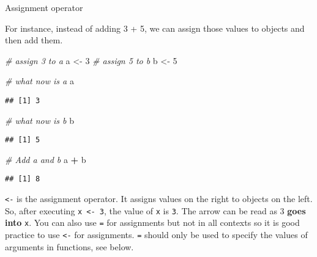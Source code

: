 \documentclass[
  11pt,
  ignorenonframetext,
]{beamer}
\newenvironment{Shaded}{\begin{snugshade}}{\end{snugshade}}
\newcommand{\CommentTok}[1]{\textcolor[rgb]{0.56,0.35,0.01}{\textit{#1}}}
\newcommand{\DecValTok}[1]{\textcolor[rgb]{0.00,0.00,0.81}{#1}}
\newcommand{\NormalTok}[1]{#1}
\newcommand{\OperatorTok}[1]{\textcolor[rgb]{0.81,0.36,0.00}{\textbf{#1}}}
\newcommand{\StringTok}[1]{\textcolor[rgb]{0.31,0.60,0.02}{#1}}
\begin{document}
\begin{frame}[fragile]{Assignment operator}
\protect\hypertarget{assignment-operator}{}

For instance, instead of adding 3 + 5, we can assign those values to
objects and then add them.

\begin{Shaded}
\begin{Highlighting}[]
\CommentTok{# assign 3 to a}
\NormalTok{a <-}\StringTok{ }\DecValTok{3}
\CommentTok{# assign 5 to b}
\NormalTok{b <-}\StringTok{ }\DecValTok{5}
\end{Highlighting}
\end{Shaded}

\begin{Shaded}
\begin{Highlighting}[]
\CommentTok{# what now is a}
\NormalTok{a}
\end{Highlighting}
\end{Shaded}

\begin{verbatim}
## [1] 3
\end{verbatim}

\begin{Shaded}
\begin{Highlighting}[]
\CommentTok{# what now is b}
\NormalTok{b}
\end{Highlighting}
\end{Shaded}

\begin{verbatim}
## [1] 5
\end{verbatim}

\begin{Shaded}
\begin{Highlighting}[]
\CommentTok{# Add a and b}
\NormalTok{a }\OperatorTok{+}\StringTok{ }\NormalTok{b}
\end{Highlighting}
\end{Shaded}

\begin{verbatim}
## [1] 8
\end{verbatim}

\texttt{\textless{}-} is the assignment operator. It assigns values on
the right to objects on the left. So, after executing
\texttt{x\ \textless{}-\ 3}, the value of \texttt{x} is \texttt{3}. The
arrow can be read as 3 \textbf{goes into} \texttt{x}. You can also use
\texttt{=} for assignments but not in all contexts so it is good
practice to use \texttt{\textless{}-} for assignments. \texttt{=} should
only be used to specify the values of arguments in functions, see below.


\end{frame}
\end{document}
